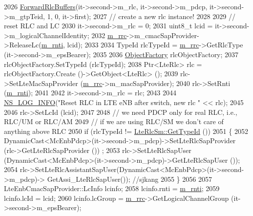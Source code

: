 \begin{DoxyCode}
2026           \hyperlink{classns3_1_1UeManager_acfe070a93481248c1d2624f02a448a34}{ForwardRlcBuffers}(it->second->m\_rlc, it->second->m\_pdcp, it->second->m\_gtpTeid, 
      1, 0, it->first);
2027           \textcolor{comment}{// create a new rlc instance!}
2028 
2029           \textcolor{comment}{// reset RLC and LC}
2030           it->second->m\_rlc = 0;
2031           uint8\_t lcid = it->second->m\_logicalChannelIdentity;
2032           \hyperlink{classns3_1_1UeManager_ab4405e9f354c66e7c1a4c95832290f5b}{m\_rrc}->m\_cmacSapProvider->ReleaseLc(\hyperlink{classns3_1_1UeManager_a5a72b4fe818f21993bd7f05d7e2c4f83}{m\_rnti}, lcid);
2033 
2034           TypeId rlcTypeId = \hyperlink{classns3_1_1UeManager_ab4405e9f354c66e7c1a4c95832290f5b}{m\_rrc}->GetRlcType (it->second->m\_epsBearer);
2035 
2036           \hyperlink{classns3_1_1Object_a2810e70b8c8377aa8617138fc0f65e92}{ObjectFactory} rlcObjectFactory;
2037           rlcObjectFactory.SetTypeId (rlcTypeId);
2038           Ptr<LteRlc> rlc = rlcObjectFactory.Create ()->GetObject<LteRlc> ();
2039           rlc->SetLteMacSapProvider (\hyperlink{classns3_1_1UeManager_ab4405e9f354c66e7c1a4c95832290f5b}{m\_rrc}->m\_macSapProvider);
2040           rlc->SetRnti (\hyperlink{classns3_1_1UeManager_a5a72b4fe818f21993bd7f05d7e2c4f83}{m\_rnti});
2041 
2042           it->second->m\_rlc = rlc;
2043 
2044           \hyperlink{group__logging_gafbd73ee2cf9f26b319f49086d8e860fb}{NS\_LOG\_INFO}(\textcolor{stringliteral}{"Reset RLC in LTE eNB after switch, new rlc "} << rlc);
2045 
2046           rlc->SetLcId (lcid);
2047 
2048           \textcolor{comment}{// we need PDCP only for real RLC, i.e., RLC/UM or RLC/AM}
2049           \textcolor{comment}{// if we are using RLC/SM we don't care of anything above RLC}
2050           \textcolor{keywordflow}{if} (rlcTypeId != \hyperlink{classns3_1_1LteRlcSm_a160bd39ce4e0d113dd5d93cc3a258045}{LteRlcSm::GetTypeId} ())
2051           \{
2052             DynamicCast<McEnbPdcp>(it->second->m\_pdcp)->SetLteRlcSapProvider (rlc->GetLteRlcSapProvider ())
      ;
2053             rlc->SetLteRlcSapUser (DynamicCast<McEnbPdcp>(it->second->m\_pdcp)->GetLteRlcSapUser ());
2054             rlc->SetLteRlcAssistantSapUser(DynamicCast<McEnbPdcp>(it->second->m\_pdcp)->
      GetAssi\_LteRlcSapUser()); \textcolor{comment}{//sjkang}
2055           \}
2056 
2057           LteEnbCmacSapProvider::LcInfo lcinfo;
2058           lcinfo.rnti = \hyperlink{classns3_1_1UeManager_a5a72b4fe818f21993bd7f05d7e2c4f83}{m\_rnti};
2059           lcinfo.lcId = lcid;
2060           lcinfo.lcGroup = \hyperlink{classns3_1_1UeManager_ab4405e9f354c66e7c1a4c95832290f5b}{m\_rrc}->GetLogicalChannelGroup (it->second->m\_epsBearer);

\end{DoxyCode}
